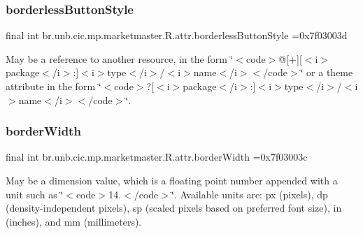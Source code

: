 \subsubsection{\texorpdfstring{borderless\+Button\+Style}{borderlessButtonStyle}}
{\footnotesize\ttfamily final int br.\+unb.\+cic.\+mp.\+marketmaster.\+R.\+attr.\+borderless\+Button\+Style =0x7f03003d\hspace{0.3cm}{\ttfamily [static]}}

May be a reference to another resource, in the form \char`\"{}$<$code$>$@\mbox{[}+\mbox{]}\mbox{[}$<$i$>$package$<$/i$>$\+:\mbox{]}$<$i$>$type$<$/i$>$/$<$i$>$name$<$/i$>$$<$/code$>$\char`\"{} or a theme attribute in the form \char`\"{}$<$code$>$?\mbox{[}$<$i$>$package$<$/i$>$\+:\mbox{]}$<$i$>$type$<$/i$>$/$<$i$>$name$<$/i$>$$<$/code$>$\char`\"{}. \mbox{\label{classbr_1_1unb_1_1cic_1_1mp_1_1marketmaster_1_1R_1_1attr_abd8186b8a4c9d381cb6990a350cea7d5}} 
\subsubsection{\texorpdfstring{border\+Width}{borderWidth}}
{\footnotesize\ttfamily final int br.\+unb.\+cic.\+mp.\+marketmaster.\+R.\+attr.\+border\+Width =0x7f03003c\hspace{0.3cm}{\ttfamily [static]}}

May be a dimension value, which is a floating point number appended with a unit such as \char`\"{}$<$code$>$14.\+5sp$<$/code$>$\char`\"{}. Available units are\+: px (pixels), dp (density-\/independent pixels), sp (scaled pixels based on preferred font size), in (inches), and mm (millimeters). \mbox{\label{classbr_1_1unb_1_1cic_1_1mp_1_1marketmaster_1_1R_1_1attr_afb3dcdb1612a6c308c9240b4a97cb31b}} 
